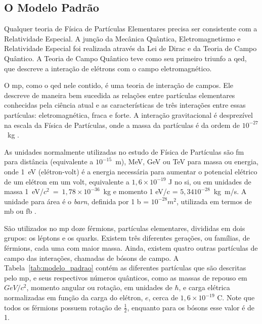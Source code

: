 \subsection{O Modelo Padrão}
\label{ssec:mp}

Qualquer teoria de Física de Partículas Elementares precisa ser consistente com
a Relatividade Especial. A junção da Mecânica Quântica, Eletromagnetismo e
Relatividade Especial foi realizada através da Lei de Dirac e da Teoria de
Campo Quântico. A Teoria de Campo Quântico teve como seu primeiro triunfo a
\gls{qed}, que descreve a interação de elétrons com o campo
eletromagnético. 

O \gls{mp}, como o \gls{qed} nele contido, é uma teoria de
interação de campos. Ele descreve de maneira 
bem sucedida as relações entre
partículas elementares conhecidas pela ciência atual 
\cite{Intro_Nuclear} e as características de
três interações entre essas partículas:
eletromagnética, fraca e forte. A interação gravitacional é
desprezível na escala da Física de Partículas, onde a massa da partículas é da
ordem de $10^{-27}$~kg \cite{Intro_Standard}.

As unidades normalmente utilizadas no estudo de Física de Partículas são fm para
distância (equivalente a $10^{-15}$~m), MeV, GeV ou TeV para massa ou energia, onde 1~eV 
(elétron-volt) é a energia necessária para aumentar o potencial elétrico de
um elétron em um volt, equivalente a $1,6\times10^{-19}$ J no \gls{si}, ou em unidades
de massa 1~eV/$c^2$~=~$1,78\times10^{-36}$~kg e momento 1 eV/c = $5,34 10^{-28}$~kg~m/s. 
A unidade para área é o \emph{barn}, definida por 1 b = $10^{-28} m^2$, utilizada em
termos de mb ou fb \cite{Intro_Nuclear}.

São utilizados no \gls{mp} doze férmions, partículas elementares, divididas em dois grupos: os
léptons e os quarks. Existem três diferentes gerações, ou famílias, de férmions, cada uma com maior
massa. Ainda, existem quatro outras partículas de campo das
interações, chamadas de bósons de campo.
A Tabela~\ref{tab:modelo_padrao} contém as diferentes partículas que são
descritas pelo \gls{mp}, e seus respectivos números quânticos, como as massas de repouso em $GeV/c^2$, momento
angular ou rotação, em unidades de $\hbar$, e carga elétrica normalizadas em função da carga
do elétron, $e$, cerca de $1,6\times10^{-19}$ C. Note que todos os férmions
possuem rotação de $\frac{1}{2}$, enquanto para os bósons esse valor é de 1.

